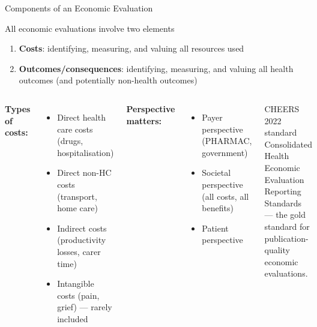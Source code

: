 \documentclass[aspectratio=169, 12pt]{beamer}
\begin{document}
\begin{frame}{Components of an Economic Evaluation}
  \begin{block}{All economic evaluations involve two elements}
    \begin{enumerate}
      \item \textbf{Costs}: identifying, measuring, and valuing all resources used
      \item \textbf{Outcomes/consequences}: identifying, measuring, and valuing all health
            outcomes (and potentially non-health outcomes)
    \end{enumerate}
  \end{block}
  \vspace{0.3em}
  \begin{columns}
      \textbf{Types of costs:}
      \begin{itemize}
        \item Direct health care costs (drugs, hospitalisation)
        \item Direct non-HC costs (transport, home care)
        \item Indirect costs (productivity losses, carer time)
        \item Intangible costs (pain, grief) --- rarely included
      \end{itemize}
      \textbf{Perspective matters:}
      \begin{itemize}
        \item Payer perspective (PHARMAC, government)
        \item Societal perspective (all costs, all benefits)
        \item Patient perspective
      \end{itemize}
      \vspace{0.3em}
      \begin{alertblock}{CHEERS 2022 standard}
        Consolidated Health Economic Evaluation Reporting Standards --- the gold standard
        for publication-quality economic evaluations.
      \end{alertblock}
  \end{columns}
\end{frame}
\end{document}
